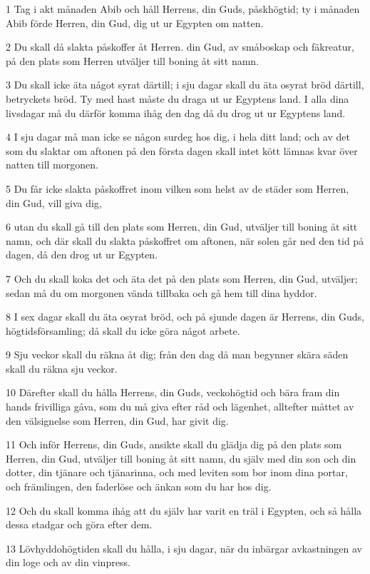 \par 1 Tag i akt månaden Abib och håll Herrens, din Guds, påskhögtid; ty i månaden Abib förde Herren, din Gud, dig ut ur Egypten om natten.
\par 2 Du skall då slakta påskoffer åt Herren. din Gud, av småboskap och fäkreatur, på den plats som Herren utväljer till boning åt sitt namn.
\par 3 Du skall icke äta något syrat därtill; i sju dagar skall du äta osyrat bröd därtill, betryckets bröd. Ty med hast måste du draga ut ur Egyptens land. I alla dina livsdagar må du därför komma ihåg den dag då du drog ut ur Egyptens land.
\par 4 I sju dagar må man icke se någon surdeg hos dig, i hela ditt land; och av det som du slaktar om aftonen på den första dagen skall intet kött lämnas kvar över natten till morgonen.
\par 5 Du får icke slakta påskoffret inom vilken som helst av de städer som Herren, din Gud, vill giva dig,
\par 6 utan du skall gå till den plats som Herren, din Gud, utväljer till boning åt sitt namn, och där skall du slakta påskoffret om aftonen, när solen går ned den tid på dagen, då den drog ut ur Egypten.
\par 7 Och du skall koka det och äta det på den plats som Herren, din Gud, utväljer; sedan må du om morgonen vända tillbaka och gå hem till dina hyddor.
\par 8 I sex dagar skall du äta osyrat bröd, och på sjunde dagen är Herrens, din Guds, högtidsförsamling; då skall du icke göra något arbete.
\par 9 Sju veckor skall du räkna åt dig; från den dag då man begynner skära säden skall du räkna sju veckor.
\par 10 Därefter skall du hålla Herrens, din Guds, veckohögtid och bära fram din hands frivilliga gåva, som du må giva efter råd och lägenhet, alltefter måttet av den välsignelse som Herren, din Gud, har givit dig.
\par 11 Och inför Herrens, din Guds, ansikte skall du glädja dig på den plats som Herren, din Gud, utväljer till boning åt sitt namn, du själv med din son och din dotter, din tjänare och tjänarinna, och med leviten som bor inom dina portar, och främlingen, den faderlöse och änkan som du har hos dig.
\par 12 Och du skall komma ihåg att du själv har varit en träl i Egypten, och så hålla dessa stadgar och göra efter dem.
\par 13 Lövhyddohögtiden skall du hålla, i sju dagar, när du inbärgar avkastningen av din loge och av din vinpress.
